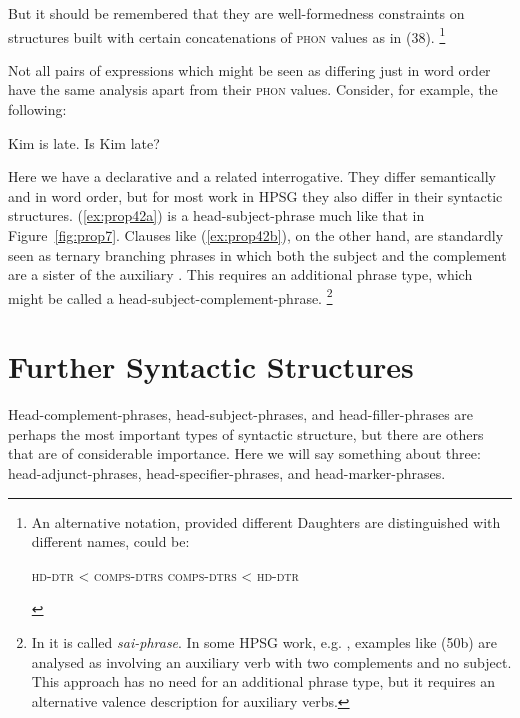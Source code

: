 \documentclass[output=paper
	        ,collection
	        ,collectionchapter
 	        ,biblatex
                ,babelshorthands
                ,newtxmath
                ,draftmode
                ,colorlinks, citecolor=brown
]{langscibook}
\begin{document}
\ea\label{ex:prop41}
	\ea\label{ex:prop41a}
	\ex\label{ex:prop41b}
	\z
\z

But it should be remembered that they are well-formedness constraints on structures built with certain concatenations of \textsc{phon} values as in (38).%
%
\footnote{An alternative notation, provided different Daughters are distinguished with different names, could be:
\begin{exe}
	 \textsc{hd-dtr} < \textsc{comps-dtrs}
	 \textsc{comps-dtrs} < \textsc{hd-dtr}
\end{exe}
}
%

Not all pairs of expressions which might be seen as differing just in word order have the same analysis apart from their \textsc{phon} values. Consider, for example, the following:

\ea\label{ex:prop42}
	\ea\label{ex:prop42a}
	Kim is late.
	\ex\label{ex:prop42b}
	Is Kim late?
	\z
\z

Here we have a declarative and a related interrogative. They differ semantically and in word order, but for most work in HPSG they also differ in their syntactic structures. (\ref{ex:prop42a}) is a head-subject-phrase much like that in Figure~\ref{fig:prop7}. Clauses like (\ref{ex:prop42b}), on the other hand, are standardly seen as ternary branching phrases in which both the subject and the complement are a sister of the auxiliary \citep[40]{ps2}. This requires an additional phrase type, which might be called a head-subject-complement-phrase.%
%
\footnote{In \citet[36]{GSag2000a-u} it is called \emph{sai-phrase}. In some HPSG work, e.g. \citet[409--414]{SWB2003a}, examples like (50b) are analysed as involving an auxiliary verb with two complements and no subject. This approach has no need for an additional phrase type, but it requires an alternative valence description for auxiliary verbs.}
%


\section{Further Syntactic Structures}

Head-complement-phrases, head-subject-phrases, and head-filler-phrases are perhaps the most important types of syntactic structure, but there are others that are of considerable importance. Here we will say something about three: head-adjunct-phrases, head-specifier-phrases, and head-marker-phrases.
\end{document}
